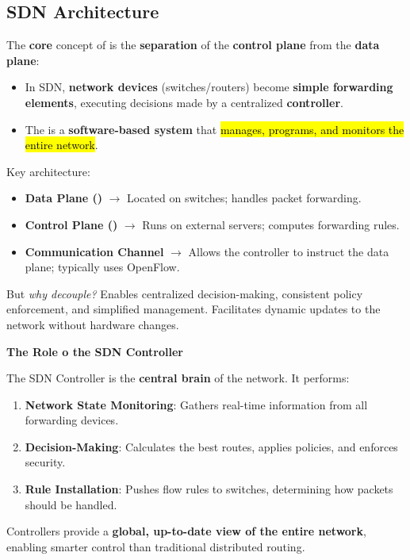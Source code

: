 \subsection{SDN Architecture}

The \textbf{core} concept of  is the \textbf{separation} of the \textbf{control plane} from the \textbf{data plane}:
\begin{itemize}
    \item In SDN, \textbf{network devices} (switches/routers) become \textbf{simple forwarding elements}, executing decisions made by a centralized \textbf{controller}.
    \item The  is a \textbf{software-based system} that \hl{manages, programs, and monitors the entire network}.
\end{itemize}
Key architecture:
\begin{itemize}
    \item \textbf{Data Plane ()} $\rightarrow$ Located on switches; handles packet forwarding.
    \item \textbf{Control Plane ()} $\rightarrow$ Runs on external servers; computes forwarding rules.
    \item \textbf{Communication Channel} $\rightarrow$ Allows the controller to instruct the data plane; typically uses OpenFlow.
\end{itemize}
But \emph{why decouple?} Enables centralized decision-making, consistent policy enforcement, and simplified management. Facilitates dynamic updates to the network without hardware changes.

\highspace
\begin{flushleft}
    \textcolor{Green3}{ \textbf{The Role o the SDN Controller}}
\end{flushleft}
The SDN Controller is the \textbf{central brain} of the network. It performs:
\begin{enumerate}[label=\textcolor{Green3}{\faIcon{check}}]
    \item \textcolor{Green3}{\textbf{Network State Monitoring}}: Gathers real-time information from all forwarding devices.
    \item \textcolor{Green3}{\textbf{Decision-Making}}: Calculates the best routes, applies policies, and enforces security.
    \item \textcolor{Green3}{\textbf{Rule Installation}}: Pushes flow rules to switches, determining how packets should be handled.
\end{enumerate}
Controllers provide a \textbf{global, up-to-date view of the entire network}, enabling smarter control than traditional distributed routing.

